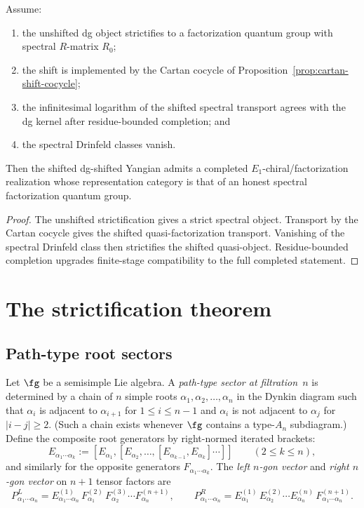 \begin{theorem}
Assume:
\begin{enumerate}
\item the unshifted dg object strictifies to a factorization quantum
 group with spectral $R$-matrix $R_0$;
\item the shift is implemented by the Cartan cocycle
 of Proposition~\ref{prop:cartan-shift-cocycle};
\item the infinitesimal logarithm of the shifted spectral transport
 agrees with the dg kernel after residue-bounded completion; and
\item the spectral Drinfeld classes vanish.
\end{enumerate}
Then the shifted dg-shifted Yangian admits a completed
$E_1$-chiral/factorization realization whose representation category is
that of an honest spectral factorization quantum group.
\end{theorem}

\begin{proof}
The unshifted strictification gives a strict spectral object.
Transport by the Cartan cocycle gives the shifted quasi-factorization
transport. Vanishing of the spectral Drinfeld class then strictifies the
shifted quasi-object. Residue-bounded completion upgrades finite-stage
compatibility to the full completed statement.
\end{proof}

\section{The strictification theorem}

\subsection{Path-type root sectors}

\begin{definition}
\label{def:path-sector}
Let $\fg$ be a semisimple Lie algebra. A \emph{path-type sector at
filtration~$n$} is determined by a chain of $n$ simple roots
$\alpha_1,\alpha_2,\ldots,\alpha_n$ in the Dynkin diagram such that
$\alpha_i$ is adjacent to $\alpha_{i+1}$ for $1\le i\le n-1$ and
$\alpha_i$ is not adjacent to $\alpha_j$ for $|i-j|\ge 2$. (Such a
chain exists whenever $\fg$ contains a type-$A_n$ subdiagram.)
Define the composite root generators by right-normed iterated brackets:
\[
E_{\alpha_1\cdots\alpha_k}
:=
[E_{\alpha_1},[E_{\alpha_2},\ldots,[E_{\alpha_{k-1}},E_{\alpha_k}]\cdots]]
\qquad (2\le k\le n),
\]
and similarly for the opposite generators $F_{\alpha_1\cdots\alpha_k}$.
The \emph{left $n$-gon vector} and \emph{right $n$-gon vector} on
$n+1$ tensor factors are
\[
P_{\alpha_1\cdots\alpha_n}^{L}
= E_{\alpha_1\cdots\alpha_n}^{(1)}\,
 F_{\alpha_1}^{(2)}\,F_{\alpha_2}^{(3)}\cdots F_{\alpha_n}^{(n+1)},
\qquad
P_{\alpha_1\cdots\alpha_n}^{R}
= E_{\alpha_1}^{(1)}\,E_{\alpha_2}^{(2)}\cdots
 E_{\alpha_n}^{(n)}\,F_{\alpha_1\cdots\alpha_n}^{(n+1)}.
\]
\end{definition}

